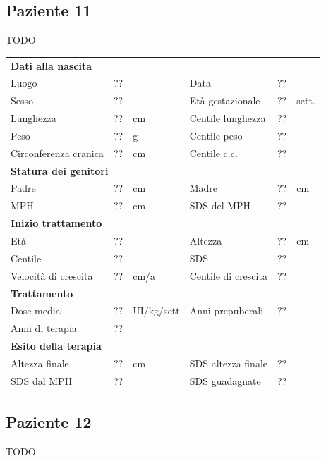 \subsection*{Paziente 11}

TODO

\begin{table}[!h]
\begin{tabular}{lrllrl}
\toprule
\multicolumn{6}{l}{\textbf{Dati alla nascita}}\\
Luogo 		& \multicolumn{2}{l}{??} 	& Data 					& \multicolumn{2}{l}{??} 	\\
Sesso 		& \multicolumn{2}{l}{??} 	& Età gestazionale 		& ?? 		& sett.\\
Lunghezza 	& ?? 		& cm 				& Centile lunghezza		& ?? 		\\
Peso 		& ?? 		& g					& Centile peso			& ?? 		\\
Circonferenza cranica	& ?? 		& cm 	& Centile c.c.			& ?? \\
\midrule
\multicolumn{6}{l}{\textbf{Statura dei genitori}}\\
Padre 		& ?? & cm 	& Madre 				& ?? & cm \\
MPH 		& ?? & cm 	& SDS del MPH 			& ??\\
\midrule
\multicolumn{6}{l}{\textbf{Inizio trattamento}} \\
Età	& ?? & 		& Altezza 				& ?? & cm  \\
Centile & ?? 	 &		& SDS		& ?? \\
Velocità di crescita & ?? & cm/a	& Centile di crescita & ??\\
\midrule
\multicolumn{6}{l}{\textbf{Trattamento}} \\
Dose media		& ?? & UI/kg/sett & Anni prepuberali & ??\\
Anni di terapia & ??\\
\midrule
\multicolumn{6}{l}{\textbf{Esito della terapia}} \\
Altezza finale			& ?? & cm 	& SDS altezza finale		& ??\\
SDS dal MPH				& ?? &		& SDS guadagnate 			& ??\\
\bottomrule
\end{tabular}
\end{table}
\clearpage


\subsection*{Paziente 12}

TODO

